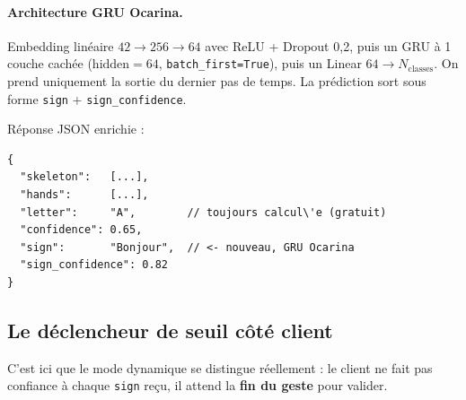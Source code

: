 \documentclass[11pt,a4paper]{article}
\begin{document}
\paragraph{Architecture GRU Ocarina.} Embedding lin\'eaire $42 \to 256
\to 64$ avec ReLU + Dropout 0{,}2, puis un GRU \`a 1 couche cach\'ee
($\text{hidden}=64$, \texttt{batch\_first=True}), puis un Linear
$64 \to N_\text{classes}$. On prend uniquement la sortie du dernier
pas de temps. La pr\'ediction sort sous forme \texttt{sign} +
\texttt{sign\_confidence}.

R\'eponse JSON enrichie :

\begin{lstlisting}
{
  "skeleton":   [...],
  "hands":      [...],
  "letter":     "A",        // toujours calcul\'e (gratuit)
  "confidence": 0.65,
  "sign":       "Bonjour",  // <- nouveau, GRU Ocarina
  "sign_confidence": 0.82
}
\end{lstlisting}

\subsection*{Le d\'eclencheur de seuil c\^ot\'e client}

C'est ici que le mode dynamique se distingue r\'eellement : le client
ne fait pas confiance \`a chaque \texttt{sign} re\c{c}u, il attend la
\textbf{fin du geste} pour valider.
\end{document}
